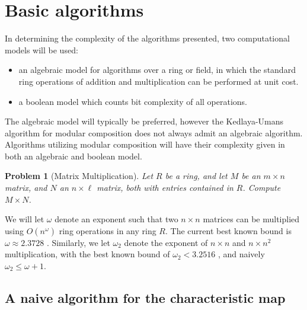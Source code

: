 \documentclass[sigconf]{acmart}
\newtheorem{problem}{Problem}
\begin{document}

\section{Basic algorithms}

In determining the complexity of the algorithms presented, two
computational models will be used:

\begin{itemize}
\item an algebraic model for algorithms over a ring or field, in which
  the standard ring operations of addition and multiplication can be
  performed at unit cost.

\item a boolean model which counts bit complexity of all operations.
\end{itemize}

The algebraic model will typically be preferred, however the
Kedlaya-Umans algorithm for modular composition does not always admit
an algebraic algorithm. Algorithms utilizing modular composition will
have their complexity given in both an algebraic and boolean model.

\begin{problem}[Matrix Multiplication]

Let $R$ be a ring, and let $M$ be an $m\times n$ matrix, and $N$ an $n
\times \ell
$ matrix, both with entries contained in $R$. Compute
$M\times N$.

\end{problem}

We will let $\omega$ denote an exponent such that two $n\times n$
matrices can be multiplied using $O(n^{\omega})$ ring operations in
any ring $R$. The current best known bound is $\omega \approx 2.3728$
\cite{DBLP:journals/corr/abs-1708-05622}. Similarly, we let $\omega_2$
denote the exponent of $n \times n$ and $n \times n^2$ multiplication,
with the best known bound of $\omega_2 < 3.2516$
\cite{DBLP:journals/corr/abs-1708-05622}, and naively $\omega_2 \leq
\omega + 1$.


\subsection{A naive algorithm for the characteristic map}
\end{document}
